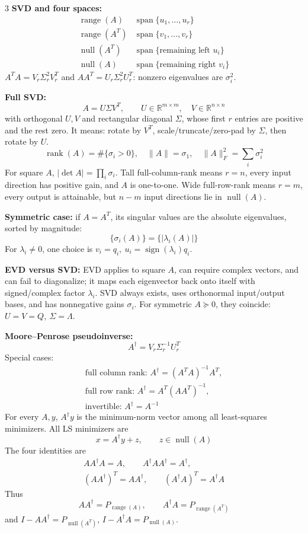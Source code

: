 \documentclass[10pt]{article}
\newcommand{\sub}[1]{\textbf{#1}}
\newcommand{\R}{\mathbb{R}}
\newcommand{\rank}{\operatorname{rank}}
\newcommand{\range}{\operatorname{range}}
\newcommand{\nullsp}{\operatorname{null}}
\newcommand{\spn}{\operatorname{span}}
\begin{document}
\begin{multicols*}{3}
\sub{SVD and four spaces:}
\[
\begin{array}{c|c}
\range(A)&\spn\{u_1,\ldots,u_r\}\\
\range(A^T)&\spn\{v_1,\ldots,v_r\}\\
\nullsp(A^T)&\spn\{\text{remaining left }u_i\}\\
\nullsp(A)&\spn\{\text{remaining right }v_i\}
\end{array}
\]
\(A^TA=V_r\Sigma_r^2V_r^T\) and
\(AA^T=U_r\Sigma_r^2U_r^T\): nonzero eigenvalues are \(\sigma_i^2\).

\sub{Full SVD:}
\[
A=U\Sigma V^T,\qquad U\in\R^{m\times m},\quad
V\in\R^{n\times n}
\]
with orthogonal \(U,V\) and rectangular diagonal \(\Sigma\), whose first
\(r\) entries are positive and the rest zero. It means: rotate by \(V^T\),
scale/truncate/zero-pad by \(\Sigma\), then rotate by \(U\).
\[
\rank(A)=\#\{\sigma_i>0\},\quad
\|A\|=\sigma_1,\quad \|A\|_F^2=\sum_i\sigma_i^2
\]
For square \(A\), \(|\det A|=\prod_i\sigma_i\).
Tall full-column-rank means \(r=n\), every input direction has positive
gain, and \(A\) is one-to-one. Wide full-row-rank means \(r=m\), every
output is attainable, but \(n-m\) input directions lie in \(\nullsp(A)\).

\sub{Symmetric case:} if \(A=A^T\), its singular values are the absolute
eigenvalues, sorted by magnitude:
\[
\{\sigma_i(A)\}=\{|\lambda_i(A)|\}
\]
For \(\lambda_i\ne0\), one choice is
\(v_i=q_i,\ u_i=\operatorname{sign}(\lambda_i)q_i\).

\sub{EVD versus SVD:} EVD applies to square \(A\), can require complex
vectors, and can fail to diagonalize; it maps each eigenvector back onto
itself with signed/complex factor \(\lambda_i\). SVD always exists,
uses orthonormal input/output bases, and has nonnegative gains
\(\sigma_i\). For symmetric \(A\succeq0\), they coincide:
\(U=V=Q,\ \Sigma=\Lambda\).

\sub{Moore--Penrose pseudoinverse:}
\[
A^\dagger=V_r\Sigma_r^{-1}U_r^T
\]
Special cases:
\[
\begin{gathered}
\text{full column rank: }A^\dagger=(A^TA)^{-1}A^T,\\
\text{full row rank: }A^\dagger=A^T(AA^T)^{-1},\\
\text{invertible: }A^\dagger=A^{-1}
\end{gathered}
\]
For every \(A,y\), \(A^\dagger y\) is the minimum-norm vector among all
least-squares minimizers. All LS minimizers are
\[
x=A^\dagger y+z,\qquad z\in\nullsp(A)
\]
The four identities are
\[
\begin{gathered}
AA^\dagger A=A,\qquad A^\dagger AA^\dagger=A^\dagger,\\
(AA^\dagger)^T=AA^\dagger,\qquad(A^\dagger A)^T=A^\dagger A
\end{gathered}
\]
Thus
\[
AA^\dagger=P_{\range(A)},\qquad
A^\dagger A=P_{\range(A^T)}
\]
and \(I-AA^\dagger=P_{\nullsp(A^T)}\),
\(I-A^\dagger A=P_{\nullsp(A)}\).


\end{multicols*}
\end{document}

